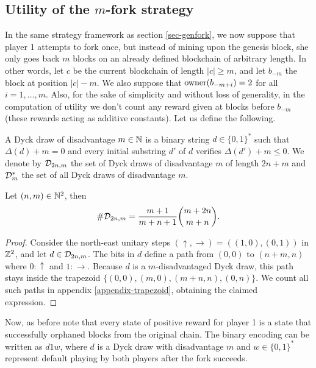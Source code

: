 \subsection{Utility of the $m$-fork strategy}


In the same strategy framework as section \ref{sec-genfork}, we now suppose that player 1 attempts to fork once, but instead of mining upon the genesis block, she only goes back $m$ blocks on an already defined blockchain of arbitrary length. In other words, let $c$ be the current blockchain of length $|c|\geq m$, and let $b_{-m}$ the block at position $|c|-m$. We also suppose that $\text{\rm owner}(b_{-m+i})=2$ for all $i=1,\dots,m$. Also, for the sake of simplicity and without loss of generality, in the computation of utility we don't count any reward given at blocks before $b_{-m}$ (these rewards acting as additive constants). Let us define the following.


\begin{mydef}
	A Dyck draw of disadvantage $m\in\mathbb{N}$ is a binary string $d\in\{0,1\}^\ast$ such that $\Delta(d)+m=0$ and every initial substring $d'$ of $d$ verifies $\Delta(d')+m\leq 0$. We denote by $\mathcal{D}_{2n,m}$ the set of Dyck draws of disadvantage $m$ of length $2n+m$ and $\mathcal{D}^\ast_{m}$ the set of all Dyck draws of disadvantage $m$.
\end{mydef}

\begin{myprop*}
	\label{prop-trapezoidcardinality}
	Let $(n,m)\in \mathbb{N}^2$, then 
	$$\#\mathcal{D}_{2n,m}=\frac{m+1}{m+n+1}{m+2n\choose m+n}.$$
\end{myprop*}
\begin{proof}
Consider the north-east unitary steps $(\uparrow,\rightarrow)=((1,0),(0,1))$ in $\mathbb{Z}^2$, and let $d\in \mathcal{D}_{2n,m}$. The bits in $d$ define a path from $(0,0)$ to $(n+m,n)$ where $0:\uparrow$ and $1:\rightarrow$. Because $d$ is a $m$-disadvantaged Dyck draw, this path stays inside the trapezoid $\{(0,0),(m,0),(m+n,n),(0,n)\}$. We count all such paths in appendix \ref{appendix-trapezoid}, obtaining the claimed expression.
\end{proof}
Now, as before note that every state of positive reward for player 1 is a state that successfully orphaned blocks from the original chain. The binary encoding can be written as $d1w$, where $d$ is a Dyck draw with disadvantage $m$ and $w\in\{0,1\}^\ast$ represent default playing by both players after the fork succeeds. 

